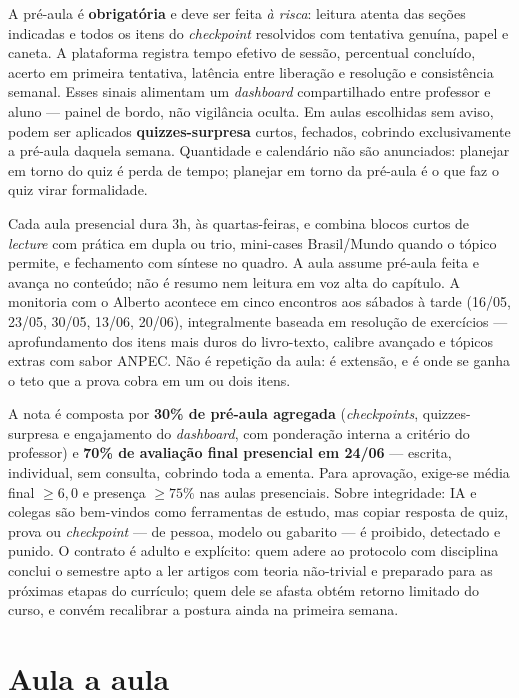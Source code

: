 \documentclass[11pt,a4paper]{article}
\begin{document}
A pré-aula é \textbf{obrigatória} e deve ser feita \emph{à risca}: leitura atenta das seções indicadas e todos os itens do \textit{checkpoint} resolvidos com tentativa genuína, papel e caneta. A plataforma registra tempo efetivo de sessão, percentual concluído, acerto em primeira tentativa, latência entre liberação e resolução e consistência semanal. Esses sinais alimentam um \textit{dashboard} compartilhado entre professor e aluno --- painel de bordo, não vigilância oculta. Em aulas escolhidas sem aviso, podem ser aplicados \textbf{quizzes-surpresa} curtos, fechados, cobrindo exclusivamente a pré-aula daquela semana. Quantidade e calendário não são anunciados: planejar em torno do quiz é perda de tempo; planejar em torno da pré-aula é o que faz o quiz virar formalidade.

Cada aula presencial dura 3h, às quartas-feiras, e combina blocos curtos de \textit{lecture} com prática em dupla ou trio, mini-cases Brasil/Mundo quando o tópico permite, e fechamento com síntese no quadro. A aula assume pré-aula feita e avança no conteúdo; não é resumo nem leitura em voz alta do capítulo. A monitoria com o Alberto acontece em cinco encontros aos sábados à tarde (16/05, 23/05, 30/05, 13/06, 20/06), integralmente baseada em resolução de exercícios --- aprofundamento dos itens mais duros do livro-texto, calibre avançado e tópicos extras com sabor ANPEC. Não é repetição da aula: é extensão, e é onde se ganha o teto que a prova cobra em um ou dois itens.

A nota é composta por \textbf{30\% de pré-aula agregada} (\textit{checkpoints}, quizzes-surpresa e engajamento do \textit{dashboard}, com ponderação interna a critério do professor) e \textbf{70\% de avaliação final presencial em 24/06} --- escrita, individual, sem consulta, cobrindo toda a ementa. Para aprovação, exige-se média final $\geq 6{,}0$ e presença $\geq 75\%$ nas aulas presenciais. Sobre integridade: IA e colegas são bem-vindos como ferramentas de estudo, mas copiar resposta de quiz, prova ou \textit{checkpoint} --- de pessoa, modelo ou gabarito --- é proibido, detectado e punido. O contrato é adulto e explícito: quem adere ao protocolo com disciplina conclui o semestre apto a ler artigos com teoria não-trivial e preparado para as próximas etapas do currículo; quem dele se afasta obtém retorno limitado do curso, e convém recalibrar a postura ainda na primeira semana.

\section{Aula a aula}
\label{sec:aulas}
\end{document}
